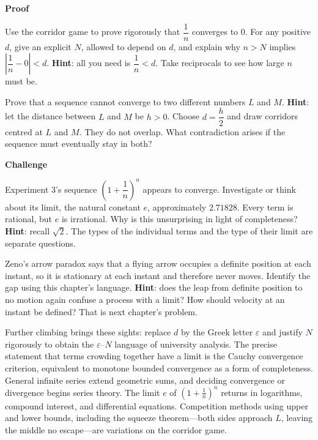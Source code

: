 \textbf{Proof}
\begin{sikao}
  \item Use the corridor game to prove rigorously that $\dfrac{1}{n}$ converges to $0$. For any positive $d$, give an explicit $N$, allowed to depend on $d$, and explain why $n>N$ implies $\left|\dfrac{1}{n}-0\right|<d$. \textbf{Hint}: all you need is $\dfrac{1}{n}<d$. Take reciprocals to see how large $n$ must be.
  \item Prove that a sequence cannot converge to two different numbers $L$ and $M$. \textbf{Hint}: let the distance between $L$ and $M$ be $h>0$. Choose $d=\dfrac{h}{2}$ and draw corridors centred at $L$ and $M$. They do not overlap. What contradiction arises if the sequence must eventually stay in both?
\end{sikao}

\textbf{Challenge}
\begin{sikao}
  \item Experiment 3's sequence $\left(1+\dfrac{1}{n}\right)^n$ appears to converge. Investigate or think about its limit, the natural constant $e$, approximately $2.71828$. Every term is rational, but $e$ is irrational. Why is this unsurprising in light of completeness? \textbf{Hint}: recall $\sqrt{2}$. The types of the individual terms and the type of their limit are separate questions.
  \item Zeno's arrow paradox says that a flying arrow occupies a definite position at each instant, so it is stationary at each instant and therefore never moves. Identify the gap using this chapter's language. \textbf{Hint}: does the leap from definite position to no motion again confuse a process with a limit? How should velocity at an instant be defined? That is next chapter's problem.
\end{sikao}

\begin{pandeng}
Further climbing brings these sights: replace $d$ by the Greek letter $\varepsilon$ and justify $N$ rigorously to obtain the $\varepsilon$--$N$ language of university analysis. The precise statement that terms crowding together have a limit is the Cauchy convergence criterion, equivalent to monotone bounded convergence as a form of completeness. General infinite series extend geometric sums, and deciding convergence or divergence begins series theory. The limit $e$ of $\left(1+\frac{1}{n}\right)^n$ returns in logarithms, compound interest, and differential equations. Competition methods using upper and lower bounds, including the squeeze theorem---both sides approach $L$, leaving the middle no escape---are variations on the corridor game.
\end{pandeng}

